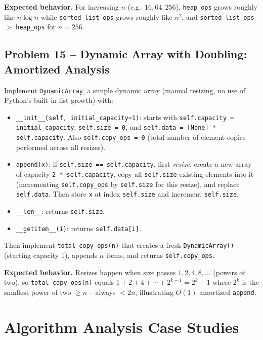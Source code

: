 \documentclass[11pt]{article}
\begin{document}
\textbf{Expected behavior.} For increasing $n$ (e.g.\ $16, 64, 256$), \texttt{heap\_ops}
grows roughly like $n \log n$ while \texttt{sorted\_list\_ops} grows roughly like $n^2$,
and \texttt{sorted\_list\_ops} $>$ \texttt{heap\_ops} for $n=256$.

\subsection*{Problem 15 -- Dynamic Array with Doubling: Amortized Analysis}

Implement \texttt{DynamicArray}, a simple dynamic array (manual resizing, no use of
Python's built-in list growth) with:
\begin{itemize}
    \item \texttt{\_\_init\_\_(self, initial\_capacity=1)}: starts with
    \texttt{self.capacity = initial\_capacity}, \texttt{self.size = 0}, and
    \texttt{self.data = [None] * self.capacity}. Also \texttt{self.copy\_ops = 0} (total
    number of element copies performed across all resizes).
    \item \texttt{append(x)}: if \texttt{self.size == self.capacity}, first \emph{resize}:
    create a new array of capacity \texttt{2 * self.capacity}, copy all
    \texttt{self.size} existing elements into it (incrementing \texttt{self.copy\_ops} by
    \texttt{self.size} for this resize), and replace \texttt{self.data}. Then store
    \texttt{x} at index \texttt{self.size} and increment \texttt{self.size}.
    \item \texttt{\_\_len\_\_}: returns \texttt{self.size}.
    \item \texttt{\_\_getitem\_\_(i)}: returns \texttt{self.data[i]}.
\end{itemize}

Then implement \texttt{total\_copy\_ops(n)} that creates a fresh \texttt{DynamicArray()}
(starting capacity 1), appends $n$ items, and returns \texttt{self.copy\_ops}.

\textbf{Expected behavior.} Resizes happen when size passes $1, 2, 4, 8, \ldots$ (powers of
two), so \texttt{total\_copy\_ops(n)} equals $1+2+4+\cdots+2^{k-1} = 2^k - 1$ where $2^k$
is the smallest power of two $\ge n$ -- always $< 2n$, illustrating $O(1)$ amortized
\texttt{append}.

\newpage
\section{Algorithm Analysis Case Studies}
\end{document}
